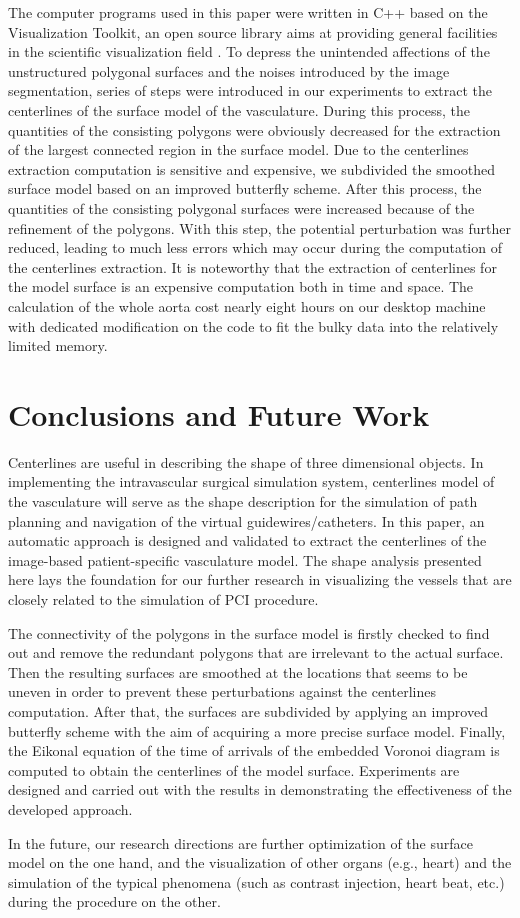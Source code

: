 The computer programs used in this paper were written in C++ based on the Visualization Toolkit, an open source library aims at providing general facilities in the scientific visualization field \cite{Schroeder2000VTK}. %
To depress the unintended affections of the unstructured polygonal surfaces and the noises introduced by the image segmentation, series of steps were introduced in our experiments to extract the centerlines of the surface model of the vasculature. %
During this process, the quantities of the consisting polygons were obviously decreased for the extraction of the largest connected region in the surface model.
Due to the centerlines extraction computation is sensitive and expensive, we subdivided the smoothed surface model based on an improved butterfly scheme.
After this process, the quantities of the consisting polygonal surfaces were increased because of the refinement of the polygons.
With this step, the potential perturbation was further reduced, leading to much less errors which may occur during the computation of the centerlines extraction.
It is noteworthy that the extraction of centerlines for the model surface is an expensive computation both in time and space.
The calculation of the whole aorta cost nearly eight hours on our desktop machine with dedicated modification on the code to fit the bulky data into the relatively limited memory. %

\section{Conclusions and Future Work}

Centerlines are useful in describing the shape of three dimensional objects.
In implementing the intravascular surgical simulation system, centerlines model of the vasculature will serve as the shape description for the simulation of path planning and navigation of the virtual guidewires/catheters.
In this paper, an automatic approach is designed and validated to extract the centerlines of the image-based patient-specific vasculature model.
The shape analysis presented here lays the foundation for our further research in visualizing the vessels that are closely related to the simulation of PCI procedure.

The connectivity of the polygons in the surface model is firstly checked to find out and remove the redundant polygons that are irrelevant to the actual surface.
Then the resulting surfaces are smoothed at the locations that seems to be uneven in order to prevent these perturbations against the centerlines computation.
After that, the surfaces are subdivided by applying an improved butterfly scheme with the aim of acquiring a more precise surface model.
Finally, the Eikonal equation of the time of arrivals of the embedded Voronoi diagram is computed to obtain the centerlines of the model surface.
Experiments are designed and carried out with the results in demonstrating the effectiveness of the developed approach.

In the future, our research directions are further optimization of the surface model on the one hand, and the visualization of other organs (e.g., heart) and the simulation of the typical phenomena (such as contrast injection, heart beat, etc.) during the procedure on the other. %
